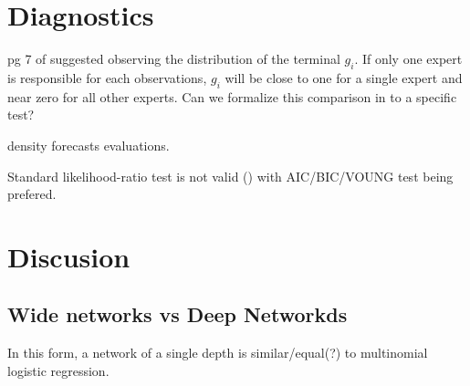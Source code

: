 \documentclass[12pt]{article}
\begin{document}

\section{Diagnostics}
pg 7 of \cite{WMS1995} suggested observing the distribution of the terminal
$g_{i}$. If only one expert is responsible for each observations, $g_{i}$ will
be close to one for a single expert and near zero for all other experts.
Can we formalize this comparison in to a specific test?

density forecasts evaluations.

Standard likelihood-ratio test is not valid (\cite{CarvalhoTanner2006}) with
AIC/BIC/VOUNG test being prefered.


  
\section{Discusion}
\subsection{Wide networks vs Deep Networkds}
In this form, a network of a single depth is similar/equal(?) to multinomial logistic regression.
\end{document}
